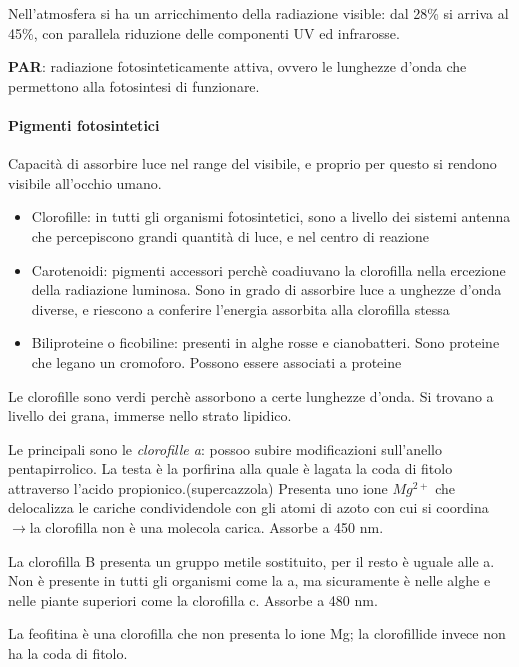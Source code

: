 \documentclass[a4paper,12pt]{book}
\newcommand{\lfreccia}{\ensuremath{\longrightarrow}}
\begin{document}
Nell’atmosfera si ha un arricchimento della radiazione visible: dal 28\% si arriva al 45\%, con parallela riduzione delle componenti UV ed infrarosse.

\textbf{PAR}: radiazione fotosinteticamente attiva, ovvero le lunghezze d’onda che permettono alla fotosintesi di funzionare.

\paragraph{Pigmenti fotosintetici}

Capacità di assorbire luce nel range del visibile, e proprio per questo si rendono visibile all’occhio umano.

\begin{itemize}

\item{Clorofille: in tutti gli organismi fotosintetici, sono a livello dei sistemi antenna che percepiscono grandi quantità di luce,  e nel centro di reazione}

\item{Carotenoidi: pigmenti accessori perchè coadiuvano la clorofilla nella ercezione della radiazione luminosa. Sono in grado di assorbire luce a unghezze d’onda diverse, e riescono a conferire l’energia assorbita alla clorofilla stessa}

\item{Biliproteine o ficobiline: presenti in alghe rosse e cianobatteri. Sono proteine che legano un cromoforo. Possono essere associati a proteine}

\end{itemize}

Le clorofille sono verdi perchè assorbono a certe lunghezze d’onda. Si trovano a livello dei grana, immerse nello strato lipidico.

Le principali sono le \emph{clorofille a}: possoo subire modificazioni sull’anello pentapirrolico. La testa è la porfirina alla quale è lagata la coda di fitolo attraverso l’acido propionico.(supercazzola) Presenta uno ione $Mg^{2+}$ che delocalizza le cariche condividendole con gli atomi di azoto con cui si coordina \lfreccia la clorofilla non è una molecola carica. Assorbe a 450 nm.

La clorofilla B presenta un gruppo metile sostituito, per il resto è uguale alle a. Non è presente in tutti gli organismi come la a, ma sicuramente è nelle alghe e nelle piante superiori come la clorofilla c. Assorbe a 480 nm.

La feofitina è una clorofilla che non presenta lo ione Mg; la clorofillide invece non ha la coda di fitolo.
\end{document}

